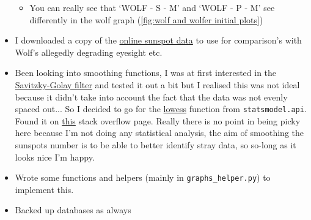 \documentclass[12pt]{article}
\begin{document}
\begin{itemize}
\begin{itemize}
        \item You can really see that `WOLF - S - M' and `WOLF - P - M' see differently in the wolf graph (\ref{fig:wolf and wolfer initial plots})
    \end{itemize}
    \item I downloaded a copy of the \href{http://www.sidc.be/silso/datafiles}{online sunspot data} to use for comparison's with Wolf's allegedly degrading eyesight etc.
    \item Been looking into smoothing functions, I was at first interested in the \href{https://en.wikipedia.org/wiki/Savitzky-Golay_filter}{Savitzky-Golay filter} and tested it out a bit but I realised this was not ideal because it didn't take into account the fact that the data was not evenly spaced out... So I decided to go for the \href{https://www.statsmodels.org/dev/generated/statsmodels.nonparametric.smoothers_lowess.lowess.html}{lowess} function from \texttt{statsmodel.api}. Found it on \href{https://stackoverflow.com/questions/28536191/how-to-filter-smooth-with-scipy-numpy#28541805}{this} stack overflow page. Really there is no point in being picky here because I'm not doing any statistical analysis, the aim of smoothing the sunspots number is to be able to better identify stray data, so so-long as it looks nice I'm happy.
    \item Wrote some functions and helpers (mainly in \texttt{graphs\_helper.py}) to implement this.
    \item Backed up databases as always
\end{itemize}
\end{document}

